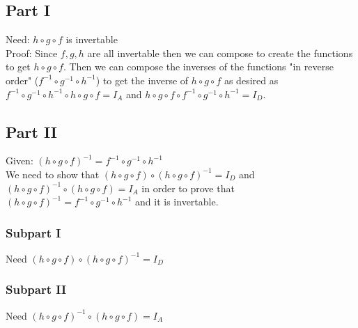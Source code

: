 \documentclass{article}
\begin{document}
\subsection*{Part I}
Need: $h \circ g \circ f$ is invertable\\
Proof: Since $f, g, h$ are all invertable then we can compose to create the functions to get $h \circ g \circ f$. Then we can compose the inverses of the functions "in reverse order" ($f^{-1} \circ g^{-1} \circ h^{-1}$) to get the inverse of $h \circ g \circ f$ as desired as $f^{-1} \circ g^{-1} \circ h^{-1} \circ h \circ g \circ f = I_A$ and $h \circ g \circ f \circ f^{-1} \circ g^{-1} \circ h^{-1} = I_D$.
\subsection*{Part II}
Given: $(h \circ g \circ f)^{-1} = f^{-1} \circ g^{-1} \circ h^{-1}$\\
We need to show that $(h \circ g \circ f) \circ (h \circ g \circ f)^{-1} = I_D$ and $(h \circ g \circ f)^{-1} \circ (h \circ g \circ f) = I_A$ in order to prove that $(h \circ g \circ f)^{-1} = f^{-1} \circ g^{-1} \circ h^{-1}$ and it is invertable.

\subsubsection*{Subpart I}
Need $(h \circ g \circ f) \circ (h \circ g \circ f)^{-1} = I_D$\\

\subsubsection*{Subpart II}
Need $(h \circ g \circ f)^{-1} \circ (h \circ g \circ f) = I_A$\\
\end{document}
